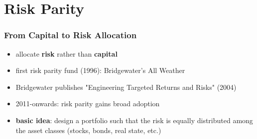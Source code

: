 \documentclass{beamer}
\begin{document}
	\setcounter{showSlideNumbers}{0}
        \section{Risk Parity}
	\setcounter{framenumber}{1}
	\setcounter{showSlideNumbers}{1}

		\begin{frame}
			\frametitle{From Capital to Risk Allocation}
			\begin{itemize}
                          \item allocate \textbf{risk} rather than \textbf{capital} \vspace{.5cm}
                            \pause
                                \item first risk parity fund (1996): Bridgewater's All Weather \vspace{.5cm}
                            \pause
                                \item Bridgewater publishes "Engineering Targeted Returns and Risks" (2004) \vspace{.5cm}
                            \pause
                                \item 2011-onwards: risk parity gains broad adoption \vspace{.5cm}
                            \pause
                                \item \textbf{basic idea}: design a portfolio such that the risk is equally distributed among the asset classes (stocks, bonds, real state,
                                  etc.)
			\end{itemize}
		\end{frame}
\end{document}

